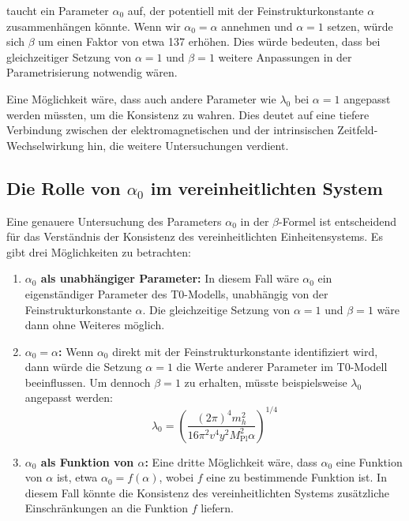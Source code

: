 \documentclass[12pt,a4paper]{article}
\newcommand{\Mpl}{M_{\text{Pl}}}
\begin{document}
	taucht ein Parameter $\alpha_0$ auf, der potentiell mit der Feinstrukturkonstante $\alpha$ zusammenhängen könnte. Wenn wir $\alpha_0 = \alpha$ annehmen und $\alpha = 1$ setzen, würde sich $\beta$ um einen Faktor von etwa 137 erhöhen. Dies würde bedeuten, dass bei gleichzeitiger Setzung von $\alpha = 1$ und $\beta = 1$ weitere Anpassungen in der Parametrisierung notwendig wären.
	
	Eine Möglichkeit wäre, dass auch andere Parameter wie $\lambda_0$ bei $\alpha = 1$ angepasst werden müssten, um die Konsistenz zu wahren. Dies deutet auf eine tiefere Verbindung zwischen der elektromagnetischen und der intrinsischen Zeitfeld-Wechselwirkung hin, die weitere Untersuchungen verdient.
	
	\subsection{Die Rolle von $\alpha_0$ im vereinheitlichten System}
	
	Eine genauere Untersuchung des Parameters $\alpha_0$ in der $\beta$-Formel ist entscheidend für das Verständnis der Konsistenz des vereinheitlichten Einheitensystems. Es gibt drei Möglichkeiten zu betrachten:
	
	\begin{enumerate}
		\item \textbf{$\alpha_0$ als unabhängiger Parameter:} In diesem Fall wäre $\alpha_0$ ein eigenständiger Parameter des T0-Modells, unabhängig von der Feinstrukturkonstante $\alpha$. Die gleichzeitige Setzung von $\alpha = 1$ und $\beta = 1$ wäre dann ohne Weiteres möglich.
		
		\item \textbf{$\alpha_0 = \alpha$:} Wenn $\alpha_0$ direkt mit der Feinstrukturkonstante identifiziert wird, dann würde die Setzung $\alpha = 1$ die Werte anderer Parameter im T0-Modell beeinflussen. Um dennoch $\beta = 1$ zu erhalten, müsste beispielsweise $\lambda_0$ angepasst werden:
		\begin{equation}
			\lambda_0 = \left(\frac{(2\pi)^4 m_h^2}{16 \pi^2 v^4 y^2 \Mpl^2 \alpha}\right)^{1/4}
		\end{equation}
		
		\item \textbf{$\alpha_0$ als Funktion von $\alpha$:} Eine dritte Möglichkeit wäre, dass $\alpha_0$ eine Funktion von $\alpha$ ist, etwa $\alpha_0 = f(\alpha)$, wobei $f$ eine zu bestimmende Funktion ist. In diesem Fall könnte die Konsistenz des vereinheitlichten Systems zusätzliche Einschränkungen an die Funktion $f$ liefern.
	\end{enumerate}
	
\end{document}
